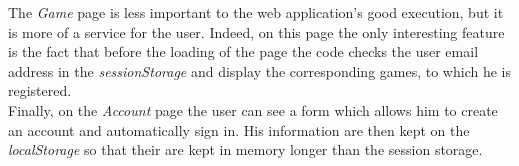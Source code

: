 \documentclass[]{article}
\begin{document}
The \textit{Game} page is less important to the web application's good execution, but it is more of a service for the user. Indeed, on this page the only interesting feature is the fact that before the loading of the page the code checks the user email address in the \textit{sessionStorage} and display the corresponding games, to which he is registered.\\
 
Finally, on the \textit{Account} page the user can see a form which allows him to create an account and automatically sign in. His information are then kept on the \textit{localStorage} so that their are kept in memory longer than the session storage. 
\end{document}
